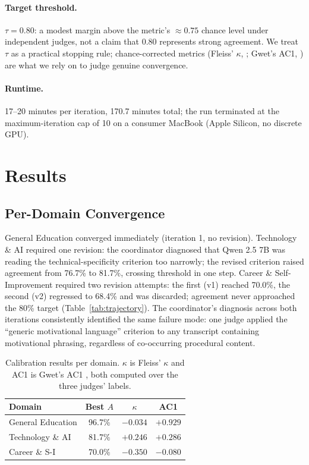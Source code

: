 \documentclass[letterpaper]{article}
\begin{document}
\paragraph{Target threshold.}
$\tau = 0.80$: a modest margin above the metric's $\approx 0.75$ chance level
under independent judges, not a claim that $0.80$ represents strong
agreement. We treat $\tau$ as a practical stopping rule; chance-corrected
metrics (Fleiss' $\kappa$, \citealp{fleiss1971}; Gwet's AC1,
\citealp{gwet2008}) are what we rely on to judge genuine convergence.

\paragraph{Runtime.}
17--20 minutes per iteration, 170.7 minutes total; the run terminated at the
maximum-iteration cap of 10 on a consumer MacBook (Apple Silicon, no discrete
GPU).

\section{Results}
\label{sec:results}

\subsection{Per-Domain Convergence}

General Education converged immediately (iteration 1, no revision).
Technology \& AI required one revision: the coordinator diagnosed that Qwen
2.5 7B was reading the technical-specificity criterion too narrowly; the
revised criterion raised agreement from 76.7\% to 81.7\%, crossing threshold
in one step. Career \& Self-Improvement required two revision attempts: the
first (v1) reached 70.0\%, the second (v2) regressed to 68.4\% and was
discarded; agreement never approached the 80\% target
(Table~\ref{tab:trajectory}). The coordinator's diagnosis across both
iterations consistently identified the same failure mode: one judge applied
the ``generic motivational language'' criterion to any transcript containing
motivational phrasing, regardless of co-occurring procedural content.

\begin{table}[tb]
\centering
{\small
\begin{tabular}{lccc}
\toprule
\textbf{Domain} & \textbf{Best} $A$ & $\kappa$ & \textbf{AC1} \\
\midrule
General Education    & 96.7\% & $-0.034$ & $+0.929$ \\
Technology \& AI     & 81.7\% & $+0.246$ & $+0.286$ \\
Career \& S-I        & 70.0\% & $-0.350$ & $-0.080$ \\
\bottomrule
\end{tabular}}
\caption{Calibration results per domain. $\kappa$ is Fleiss' $\kappa$
\citep{fleiss1971} and AC1 is Gwet's AC1 \citep{gwet2008}, both computed over
the three judges' labels.}
\label{tab:results}
\end{table}
\end{document}
